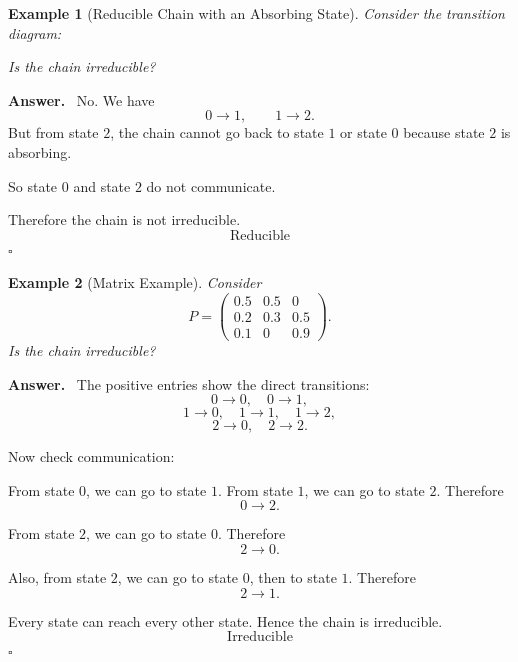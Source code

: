 \documentclass[12pt,a4paper]{article}
\theoremstyle{notestyle}
\newtheorem{example}{Example}
\newenvironment{answer}
{\par\textbf{Answer.}\ }
{\hfill$\square$\par}
\begin{document}
\begin{example}[Reducible Chain with an Absorbing State]
Consider the transition diagram:

\begin{center}
\end{center}

Is the chain irreducible?
\end{example}

\begin{answer}
No. We have
\[
0\to 1,\qquad 1\to 2.
\]
But from state $2$, the chain cannot go back to state $1$ or state $0$ because state $2$ is absorbing.

So state $0$ and state $2$ do not communicate.

Therefore the chain is not irreducible.
\[
\boxed{\text{Reducible}}
\]
\end{answer}

\begin{example}[Matrix Example]
Consider
\[
P=
\begin{pmatrix}
0.5 & 0.5 & 0\\
0.2 & 0.3 & 0.5\\
0.1 & 0 & 0.9
\end{pmatrix}.
\]
Is the chain irreducible?
\end{example}

\begin{answer}
The positive entries show the direct transitions:
\[
0\to 0,\quad 0\to 1,
\]
\[
1\to 0,\quad 1\to 1,\quad 1\to 2,
\]
\[
2\to 0,\quad 2\to 2.
\]

Now check communication:

From state $0$, we can go to state $1$. From state $1$, we can go to state $2$. Therefore
\[
0\to 2.
\]

From state $2$, we can go to state $0$. Therefore
\[
2\to 0.
\]

Also, from state $2$, we can go to state $0$, then to state $1$. Therefore
\[
2\to 1.
\]

Every state can reach every other state. Hence the chain is irreducible.
\[
\boxed{\text{Irreducible}}
\]
\end{answer}
\end{document}
